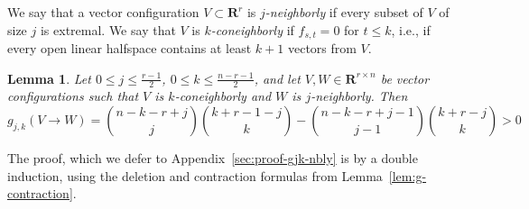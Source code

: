 \documentclass[11pt]{article}
\newtheorem{lemma}[theorem]{Lemma}
\renewcommand{\leq}{\leqslant}
\newcommand{\R}{\mathbf{R}}
\begin{document}
%
We say that a vector configuration $V\subset \R^r$ is \emph{$j$-neighborly} if every subset of $V$ of size $j$ is extremal. We say that $V$ is \emph{$k$-coneighborly} if $f_{s,t}=0$ for $t\leq k$, i.e., if every open linear halfspace contains at least $k+1$ vectors from $V$.
\begin{lemma}\label{gjk-nbly} Let $0\leq j\leq \frac{r-1}{2}$, $0\leq k\leq \frac{n-r-1}{2}$, and let $V,W \in \R^{r\times n}$ be vector configurations such that $V$ is $k$-coneighborly and $W$ is $j$-neighborly. Then 
\begin{equation}
\label{eq:gjk-nbly}
\textstyle g_{j,k}(V\to W)=\binom{n-k-r+j}{j}\binom{k+r-1-j}{k} - \binom{n-k-r+j-1}{j-1} \binom{k+r-j}{k} > 0
\end{equation}
\end{lemma}
The proof, which we defer to Appendix~\ref{sec:proof-gjk-nbly} is by a double induction, using the deletion and contraction formulas from Lemma~\ref{lem:g-contraction}. 
%
%
\end{document}
